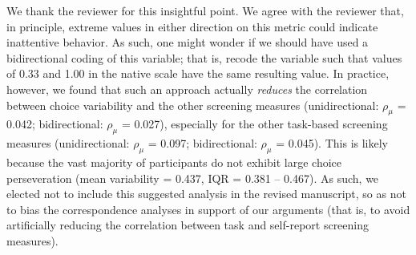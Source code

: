 \documentclass[a4paper,notitlepage,12pt]{article}
\begin{document}
We thank the reviewer for this insightful point. We agree with the reviewer that, in principle, extreme values in either direction on this metric could indicate inattentive behavior. As such, one might wonder if we should have used a bidirectional coding of this variable; that is, recode the variable such that values of 0.33 and 1.00 in the native scale have the same resulting value. In practice, however, we found that such an approach actually \textit{reduces} the correlation between choice variability and the other screening measures (unidirectional: $\rho_\mu$ = 0.042; bidirectional: $\rho_\mu$ = 0.027), especially for the other task-based screening measures (unidirectional: $\rho_\mu$ = 0.097; bidirectional: $\rho_\mu$ = 0.045). This is likely because the vast majority of participants do not exhibit large choice perseveration (mean variability = 0.437, IQR = 0.381 -- 0.467). As such, we elected not to include this suggested analysis in the revised manuscript, so as not to bias the correspondence analyses in support of our arguments (that is, to avoid artificially reducing the correlation between task and self-report screening measures). 

\printbibliography
\end{document}
